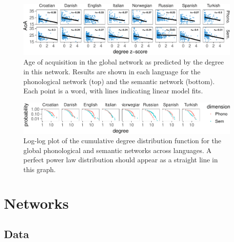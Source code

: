 \documentclass[10pt, letterpaper]{article}
\newenvironment{CodeChunk}{}{}
\begin{document}
\begin{CodeChunk}
\begin{figure}[h]

{\centering \includegraphics{figs/all_data-1} 

}

\caption{\label{fig:data_all}Age of acquisition in the global network as predicted by the degree in this network. Results are shown in each language for the phonological network (top) and the semantic network (bottom). Each point is a word, with lines indicating linear model fits.}\label{fig:all_data}
\end{figure}
\end{CodeChunk}

\begin{CodeChunk}
\begin{figure}[h]

{\centering \includegraphics{figs/degree_distribution-1} 

}

\caption{\label{fig:degree_distribution}Log-log plot of the cumulative degree distribution function for the global phonological and semantic networks across languages. A perfect power law distribution should appear as a straight line in this graph.}\label{fig:degree_distribution}
\end{figure}
\end{CodeChunk}

\section{Networks}\label{networks}

\subsection{Data}\label{data}
\end{document}
